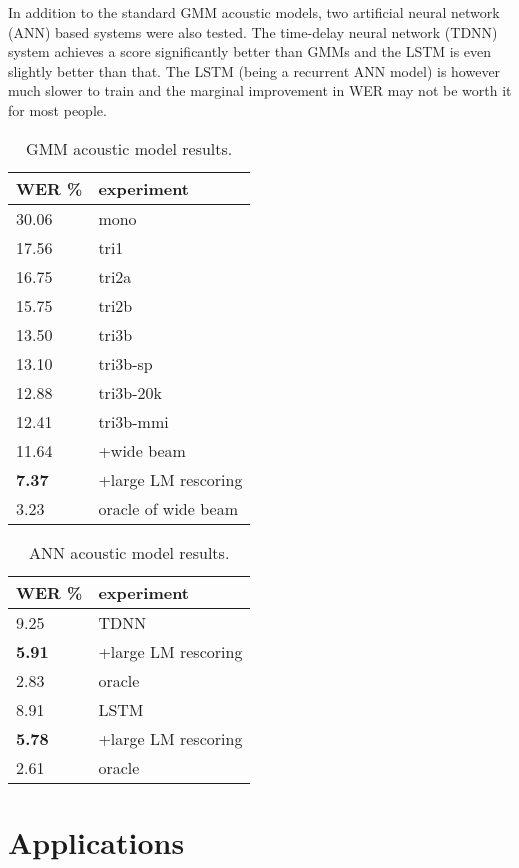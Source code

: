 \documentclass[a4paper,11pt]{article}
\begin{document}
In addition to the standard GMM acoustic models, two artificial neural network (ANN) based systems were also tested. The time-delay neural network (TDNN) system achieves a score significantly better than GMMs and the LSTM is even slightly better than that. The LSTM (being a recurrent ANN model) is however much slower to train and the marginal improvement in WER may not be worth it for most people.

\begin{table}
\centering
\begin{tabular}{ll}
\hline
WER \% & experiment               \\
\hline
\hline
30.06 & mono               \\
17.56 & tri1               \\
16.75 & tri2a              \\
15.75 & tri2b              \\
13.50  & tri3b              \\
13.10  & tri3b-sp           \\
12.88 & tri3b-20k          \\
12.41 & tri3b-mmi          \\
11.64 & +wide beam     \\
\textbf{7.37}  & +large LM rescoring \\
3.23 & oracle of wide beam \\
\hline
\end{tabular}
\caption{GMM acoustic model results.}
\label{gmm-res}
\end{table}

\begin{table}
\centering
\begin{tabular}{ll}
\hline
WER \% & experiment               \\
\hline
\hline
9.25   & TDNN                 \\
\textbf{5.91}   & +large LM rescoring \\
2.83 & oracle \\
\hline
8.91   & LSTM                 \\
\textbf{5.78}   & +large LM rescoring \\
2.61 & oracle  \\
\hline
\end{tabular}
\caption{ANN acoustic model results.}
\label{ann-res}
\end{table}


\section{Applications}
\end{document}

